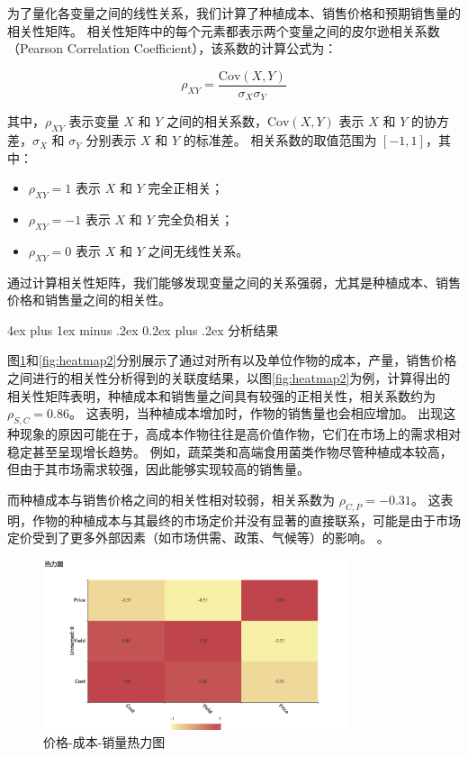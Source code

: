 \documentclass[12pt,a4paper]{nmmcm}
\makeatletter
\renewcommand\subsubsection{\@startsection{subsubsection}{3}{1em}%
  {4ex plus 1ex minus .2ex}%
  {0.2ex plus .2ex}%
  {\normalfont\large\bfseries}}
\makeatother
\begin{document}
为了量化各变量之间的线性关系，我们计算了种植成本、销售价格和预期销售量的相关性矩阵。
相关性矩阵中的每个元素都表示两个变量之间的皮尔逊相关系数（Pearson Correlation Coefficient），该系数的计算公式为：

\[
  \rho_{XY} = \frac{\mathrm{Cov}(X, Y)}{\sigma_X \sigma_Y}
\]

其中，$\rho_{XY}$ 表示变量 $X$ 和 $Y$ 之间的相关系数，$\mathrm{Cov}(X, Y)$ 表示 $X$ 和 $Y$ 的协方差，$\sigma_X$ 和 $\sigma_Y$ 分别表示 $X$ 和 $Y$ 的标准差。
相关系数的取值范围为 $[-1, 1]$，其中：
\begin{itemize}
  \item $\rho_{XY} = 1$ 表示 $X$ 和 $Y$ 完全正相关；
  \item $\rho_{XY} = -1$ 表示 $X$ 和 $Y$ 完全负相关；
  \item $\rho_{XY} = 0$ 表示 $X$ 和 $Y$ 之间无线性关系。

\end{itemize}

通过计算相关性矩阵，我们能够发现变量之间的关系强弱，尤其是种植成本、销售价格和销售量之间的相关性。


\subsubsection{分析结果}

图\ref{fig:heatmap}和\ref{fig:heatmap2}分别展示了通过对所有以及单位作物的成本，产量，销售价格之间进行的相关性分析得到的关联度结果，以图\ref{fig:heatmap2}为例，计算得出的相关性矩阵表明，种植成本和销售量之间具有较强的正相关性，相关系数约为 $\rho_{S,C} = 0.86$。
这表明，当种植成本增加时，作物的销售量也会相应增加。
出现这种现象的原因可能在于，高成本作物往往是高价值作物，它们在市场上的需求相对稳定甚至呈现增长趋势。
例如，蔬菜类和高端食用菌类作物尽管种植成本较高，但由于其市场需求较强，因此能够实现较高的销售量。

而种植成本与销售价格之间的相关性相对较弱，相关系数为 $\rho_{C,P} = -0.31$。
这表明，作物的种植成本与其最终的市场定价并没有显著的直接联系，可能是由于市场定价受到了更多外部因素（如市场供需、政策、气候等）的影响。
。


\begin{figure}[H]
  \centering
  \includegraphics[width=0.8\textwidth]{figures/prob3/correlation/价格_成本_销量热力图.png}
  \caption{价格-成本-销量热力图}
  \label{fig:heatmap}
\end{figure}
\end{document}
